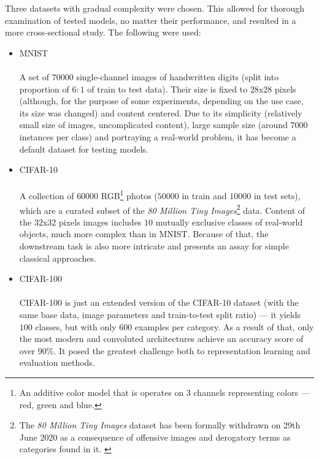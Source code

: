 \vspace{\baselineskip}
Three datasets with gradual complexity were chosen. This allowed for thorough examination of tested models, no matter their performance, and resulted in a more cross-sectional study. The following were used:



\vspace{\baselineskip}
\begin{itemize}
    \item MNIST \cite{deng2012mnist, LeCun1998}
    \\\\ A set of $70000$ single-channel images of handwritten digits (split into proportion of $6:1$ of train to test data). Their size is fixed to $28$x$28$ pixels (although, for the purpose of some experiments, depending on the use case, its size was changed) and content centered. Due to its simplicity (relatively small size of images, uncomplicated content), large sample size (around $7000$ instances per class) and portraying a real-world problem, it has become a default dataset for testing models.
    \item CIFAR-10 \cite{Krizhevsky2009}
    \\\\ A collection of $60000$ RGB\footnote{An additive color model that is operates on $3$ channels representing colors — red, green and blue.} photos ($50000$ in train and $10000$ in test sets), which are a curated subset of the \textit{80 Million Tiny Images}\footnote{The \textit{80 Million Tiny Images} dataset has been formally withdrawn on 29th June 2020 as a consequence of offensive images and derogatory terms as categories found in it. \cite{Birhane2021}} data. Content of the $32$x$32$ pixels images includes $10$ mutually exclusive classes of real-world objects, much more complex than in MNIST. Because of that, the downstream task is also more intricate and presents an assay for simple classical approaches.
    \item CIFAR-100 \cite{Krizhevsky2009}
    \\\\ CIFAR-100 is just an extended version of the CIFAR-10 dataset (with the same base data, image parameters and train-to-test split ratio) — it yields $100$ classes, but with only $600$ examples per category. As a result of that, only the most modern and convoluted architectures achieve an accuracy score of over $90\%$. It posed the greatest challenge both to representation learning and evaluation methods.
\end{itemize}

